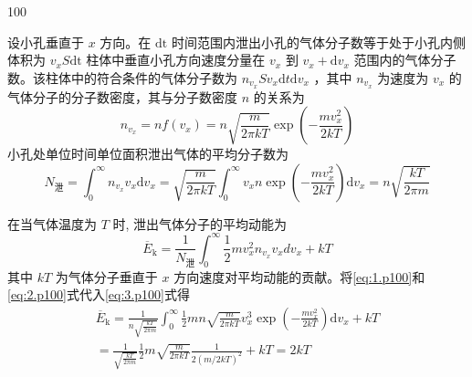 \begin{solution}{100}
    \begin{subsolution}
        设小孔垂直于 $x$ 方向。在 $\mathrm{dt}$ 时间范围内泄出小孔的气体分子数等于处于小孔内侧体积为 $v_{x}S\mathrm{dt}$ 柱体中垂直小孔方向速度分量在 $v_{x}$ 到 $v_{x} + \mathrm{d}v_{x}$ 范围内的气体分子数。该柱体中的符合条件的气体分子数为 $n_{v_x}Sv_x\mathrm{d}t\mathrm{d}v_x$ ，其中 $n_{v_x}$ 为速度为 $v_{x}$ 的气体分子的分子数密度，其与分子数密度 $n$ 的关系为
        \begin{equation}
            n _ {v _ {x}} = n f (v _ {x}) = n \sqrt {\frac {m}{2 \pi k T}} \exp (- \frac {m v _ {x} ^ {2}}{2 k T})
            \label{eq:1.p100}
        \end{equation}
        小孔处单位时间单位面积泄出气体的平均分子数为
        \begin{equation}
            N _ {\text {泄}} = \int_ {0} ^ {\infty} n _ {v _ {x}} v _ {x} \mathrm{d} v _ {x} = \sqrt {\frac {m}{2 \pi k T}} \int_ {0} ^ {\infty} v _ {x} n \exp \left(- \frac {m v _ {x} ^ {2}}{2 k T}\right) \mathrm{d} v _ {x} = n \sqrt {\frac {k T}{2 \pi m}}
            \label{eq:2.p100}
        \end{equation}
    \end{subsolution}
    \begin{subsolution}
        在当气体温度为 $T$ 时, 泄出气体分子的平均动能为
        \begin{equation}
            \overline {{{E}}} _ {\mathrm{k}} = \frac {1}{N _ {\text {泄}}} \int_ {0} ^ {\infty} \frac {1}{2} m v _ {x} ^ {2} n _ {v _ {x}} v _ {x} d v _ {x} + k T
            \label{eq:3.p100}
        \end{equation}
        其中 $kT$ 为气体分子垂直于 $x$ 方向速度对平均动能的贡献。将\eqref{eq:1.p100}和\eqref{eq:2.p100}式代入\eqref{eq:3.p100}式得
        \begin{equation}
            \begin{array}{l} \overline {{{E}}} _ {\mathrm{k}} = \frac {1}{n \sqrt {\frac {k T}{2 \pi m}}} \int_ {0} ^ {\infty} \frac {1}{2} m n \sqrt {\frac {m}{2 \pi k T}} v _ {x} ^ {3} \exp (- \frac {m v _ {x} ^ {2}}{2 k T}) \mathrm{d} v _ {x} + k T \\ = \frac {1}{\sqrt {\frac {k T}{2 \pi m}}} \frac {1}{2} m \sqrt {\frac {m}{2 \pi k T}} \frac {1}{2 (m / 2 k T) ^ {2}} + k T = 2 k T \end{array}
            \label{eq:4.p100}
        \end{equation}
    \end{subsolution}

\end{solution}
